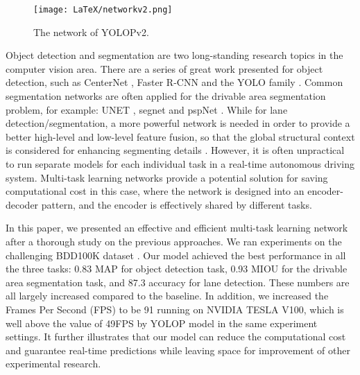 \documentclass[10pt,twocolumn,letterpaper]{article}
\begin{document}
\begin{figure}
        \begin{center}
            \texttt{[image: LaTeX/networkv2.png]}
        \end{center}
\caption{The network of YOLOPv2.}
        \label{fig:network}        
\end{figure}

Object detection and segmentation are two long-standing research topics in the computer vision area. 
There are a series of great work presented for object detection, such as CenterNet \cite{Duan_2019_ICCV}, Faster R-CNN \cite{ren2015faster} and the YOLO family \cite{redmon2017yolo9000,redmon2018yolov3,wang2021scaled,wang2021you,wang2022yolov7,ge2021yolox}. Common segmentation networks are often applied for the drivable area segmentation problem, for example: UNET \cite{huang2020unet}, segnet \cite{badrinarayanan2017segnet} and pspNet \cite{zhao2017pyramid}. 
While for lane detection/segmentation, a more powerful network is needed in order to provide a better high-level and low-level feature fusion, so that the global structural context is considered for enhancing segmenting details \cite{parashar2017scnn,hou2019learning,wang2018lanenet}.
However, it is often unpractical to run separate models for each individual task in a real-time autonomous driving system. Multi-task learning networks \cite{teichmann2018multinet,qian2019dlt,wu2021yolop,vu2022hybridnets} provide a potential solution for saving computational cost in this case, where the network is designed into an encoder-decoder pattern, and the encoder is effectively shared by different tasks. 

In this paper, we presented an effective and efficient multi-task learning network after a thorough study on the previous approaches. We ran experiments on the challenging BDD100K dataset \cite{yu2018bdd100k}. Our model achieved the best performance in all the three tasks: 0.83 MAP for object detection task, 0.93 MIOU for the drivable area segmentation task, and 87.3 accuracy for lane detection. These numbers are all largely increased compared to the baseline. In addition, we increased the Frames Per Second (FPS) to be 91 running on NVIDIA TESLA V100, which is well above the value of 49FPS by YOLOP model in the same experiment settings. It further illustrates that our model can reduce the computational cost and guarantee real-time predictions while leaving space for improvement of other experimental research.
\end{document}
